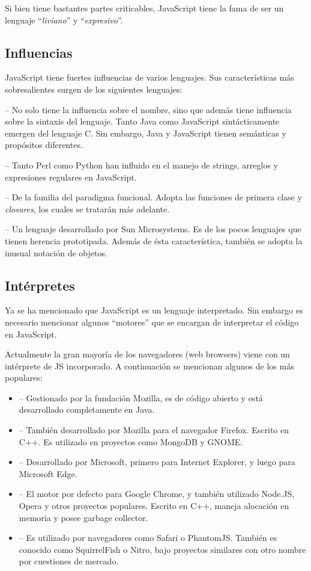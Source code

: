 Si bien tiene bastantes partes criticables, JavaScript tiene la fama de ser un lenguaje "`\textit{liviano}"' y "`\textit{expresivo}"'.

\subsection{Influencias}

JavaScript tiene fuertes influencias de varios lenguajes. Sus características más sobresalientes surgen de los siguientes lenguajes: 

 -- No solo tiene la influencia sobre el nombre, sino que además tiene influencia sobre la sintaxis del lenguaje. Tanto Java como JavaScript sintácticamente emergen del lenguaje C. Sin embargo, Java y JavaScript tienen semánticas y propósitos diferentes.

 -- Tanto Perl como Python han influido en el manejo de strings, arreglos y expresiones regulares en JavaScript.

 -- De la familia del paradigma funcional. Adopta las funciones de primera clase y \textit{closures}, los cuales se tratarán más adelante.

 -- Un lenguaje desarrollado por Sun Microsystems. Es de los pocos lenguajes que tienen herencia prototipada. Además de ésta característica, también se adopta la inusual notación de objetos.

\subsection{Intérpretes}

Ya se ha mencionado que JavaScript es un lenguaje interpretado. Sin embargo es necesario mencionar algunos "`motores"' que se encargan de interpretar el código en JavaScript.

Actualmente la gran mayoría de los navegadores (web browsers) viene con un intérprete de JS incorporado. A continuación se mencionan algunos de los más populares:

\begin{itemize}
\item {} -- Gestionado por la fundación Mozilla, es de código abierto y está desarrollado completamente en Java.
\item {} -- También desarrollado por Mozilla para el navegador Firefox. Escrito en C++. Es utilizado en proyectos como MongoDB y GNOME.
\item {} -- Desarrollado por Microsoft, primero para Internet Explorer, y luego para Microsoft Edge.
\item {} -- El motor por defecto para Google Chrome, y también utilizado Node.JS, Opera y otros proyectos populares. Escrito en C++, maneja alocación en memoria y posee garbage collector.
\item {} -- Es utilizado por navegadores como Safari o PhantomJS. También es conocido como SquirrelFish o Nitro, bajo proyectos similares con otro nombre por cuestiones de mercado.
\end{itemize}

